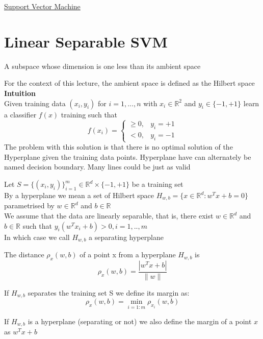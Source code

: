 \documentclass{article}[18pt]
\begin{document}
\begin{center}
\underline{\huge Support Vector Machine}
\end{center}
\section{Linear Separable SVM}
\begin{definition}[Hyperplane]
A subspace whose dimension is one less than its ambient space
\end{definition}
For the context of this lecture, the ambient space is defined as the Hilbert space
\textbf{Intuition}\\
Given training data $(x_i,y_i)$ for $i=1,...,n$ with $x_i\in \mathbb{R}^2$ and $y_i\in\{-1,+1\}$ learn a classifier $f(x)$ training such that
$$f\left(x_{i}\right)=\left\{\begin{array}{ll}
\geq 0, & y_{i}=+1 \\
<0, & y_{i}=-1
\end{array}\right.$$
The problem with this solution is that there is no optimal solution of the Hyperplane given the training data points. Hyperplane have can alternately be named decision boundary. Many lines could be just as valid
\begin{definition}
Let $S=\{(x_i,y_i)\}^m_{i=1}\in \mathbb{R}^d\times \{-1,+1\}$ be a training set\\
By a hyperplane we mean a set of Hilbert space $H_{w,b}=\{x\in \mathbb{R}^d:w^Tx+b=0\}$ parametrised by $w\in \mathbb{R}^d$ and $b\in \mathbb{R}$\\
We assume that the data are linearly separable, that is, there exist $w\in \mathbb{R}^d$ and $b\in \mathbb{R}$ such that $y_i(w^Tx_i+b)>0,i=1,..,m$\\
In which case we call $H_{w,b}$ a separating hyperplane
\end{definition}
\begin{definition}[Distance]
The distance $\rho_x(w,b)$ of a point x from a hyperplane $H_{w,b}$ is
$$\rho_{x}(w, b)=\frac{\left|w^{T} x+b\right|}{\|w\|}$$
\end{definition}
\begin{definition}[Margin]
If $H_{w,b}$ separates the training set S we define its margin as:
$$\rho_{x}(w,b)=\min_{i=1:m}\rho_{x_i}(w,b)$$
\end{definition}
If $H_{w,b}$ is a hyperplane (separating or not) we also define the margin of a point $x$ as $w^Tx+b$
\end{document}
